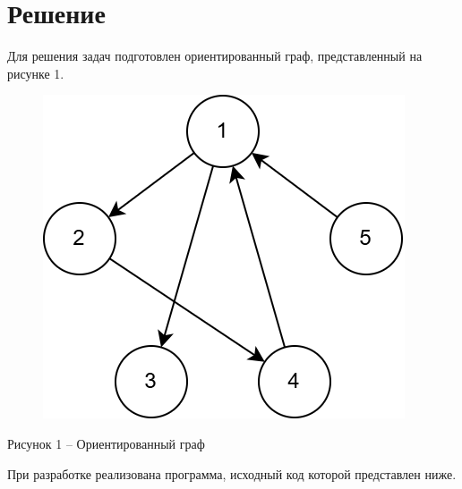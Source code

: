 \documentclass[a4paper,14pt]{extarticle}
\begin{document}
  \section*{\hspace{12.5mm}Решение}

  Для решения задач подготовлен ориентированный граф, представленный на рисунке 1.

  \begin{figure}[h]
    \centering
    \includegraphics[width=0.4\linewidth]{images/graph.png}
  \end{figure}
  \begin{center}
    Рисунок 1 – Ориентированный граф
  \end{center}

  \pagebreak

  \pagebreak
  При разработке реализована программа, исходный код которой представлен ниже.

  \begingroup
    \linespread{1}
\end{document}
